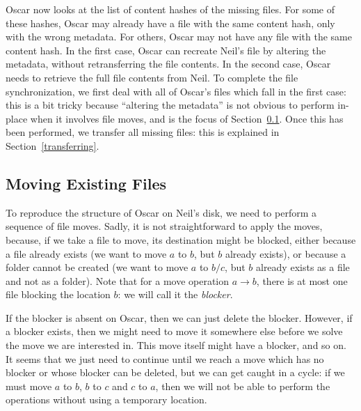 \documentclass[11pt]{llncs}
\begin{document}
Oscar now looks at the list of content hashes of the missing files. For some of
these hashes, Oscar may already have a file with the same content hash, only
with the wrong metadata. For others, Oscar may not have any file with the same
content hash. In the first case, Oscar can recreate Neil's file by altering the
metadata, without retransferring the file contents. In the second case, Oscar
needs to retrieve the full file contents from Neil. To complete the file
synchronization, we first deal with all of Oscar's files which fall in the first
case: this is a bit tricky because ``altering the metadata'' is not obvious to
perform in-place when it involves file moves, and is the focus of
Section~\ref{moving}. Once this has been performed, we transfer all missing
files: this is explained in Section~\ref{transferring}.

\subsection{Moving Existing Files}
\label{moving}

To reproduce the structure of Oscar on Neil's disk, we need to perform a sequence of file moves. Sadly, it is not straightforward to apply the moves, because, if we take a file to move, its destination might be blocked, either because a file already exists (we want to move $a$ to $b$, but $b$ already exists), or because a folder cannot be created (we want to move $a$ to $b/c$, but $b$ already exists as a file and not as a folder). Note that for a move operation $a \rightarrow b$, there is at most one file blocking the location $b$: we will call it the {\sl blocker}.

If the blocker is absent on Oscar, then we can just delete the blocker. However, if a blocker exists, then we might need to move it somewhere else before we solve the move we are interested in. This move itself might have a blocker, and so on. It seems that we just need to continue until we reach a move which has no blocker or whose blocker can be deleted, but we can get caught in a cycle: if we must move $a$ to $b$, $b$ to $c$ and $c$ to $a$, then we will not be able to perform the operations without using a temporary location.
\end{document}

